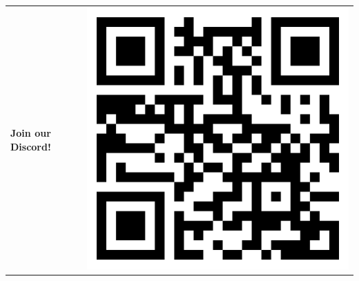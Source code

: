\documentclass[12pt]{article}
\begin{document}
\vspace{0.1mm}
\begin{center}
	\begin{tabular}{m{15em} m{1mm} m{8em}}
		\Large {\textbf{Join our Discord!}} & &
		\includegraphics[scale=0.07]{discord.png}
	\end{tabular}
\end{center}
\end{document}
